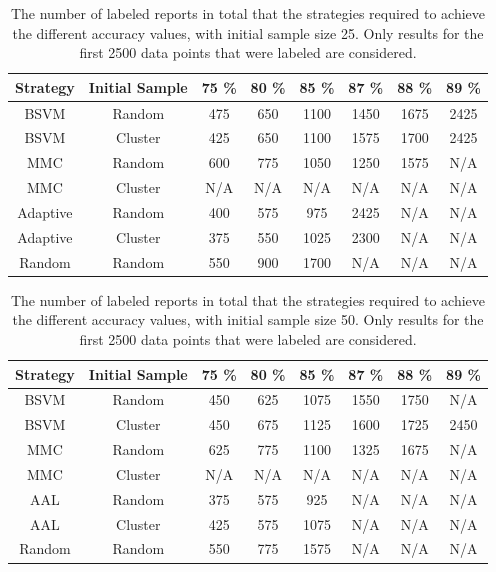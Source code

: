 \begin{table}
    \centering
    \begin{tabular}{|cccccccc|}
        \hline
        \textbf{Strategy} & \textbf{Initial Sample} & \textbf{75 \%} & \textbf{80 \%} & \textbf{85 \%} & \textbf{87 \%} & \textbf{88 \%} & \textbf{89 \%}\\
        \hline
        BSVM & Random & 475 & 650 & 1100 & 1450 & 1675 & 2425\\
        BSVM & Cluster & 425 & 650 & 1100 & 1575 & 1700 & 2425\\
        MMC & Random & 600 & 775 & 1050 & 1250 & 1575 & N/A\\
        MMC & Cluster & N/A & N/A & N/A & N/A & N/A & N/A\\
        Adaptive & Random & 400 & 575 & 975 & 2425 & N/A & N/A\\
        Adaptive & Cluster & 375 & 550 & 1025 & 2300 & N/A & N/A\\
        Random & Random & 550 & 900 & 1700 & N/A & N/A & N/A\\
        \hline
    \end{tabular}
    \caption{The number of labeled reports in total that the strategies required to achieve the different accuracy values, with initial sample size 25. Only results for the first 2500 data points that were labeled are considered.}
    \label{tab:active-learning-accuracy-25}
\end{table}

\begin{table}
    \centering
    \begin{tabular}{|cccccccc|}
        \hline
        \textbf{Strategy} & \textbf{Initial Sample} & \textbf{75 \%} & \textbf{80 \%} & \textbf{85 \%} & \textbf{87 \%} & \textbf{88 \%} & \textbf{89 \%}\\
        \hline
        BSVM & Random & 450 & 625 & 1075 & 1550 & 1750 & N/A\\
        BSVM & Cluster & 450 & 675 & 1125 & 1600 & 1725 & 2450\\
        MMC & Random & 625 & 775 & 1100 & 1325 & 1675 & N/A\\
        MMC & Cluster & N/A & N/A & N/A & N/A & N/A & N/A\\
        AAL & Random & 375 & 575 & 925 & N/A & N/A & N/A\\
        AAL & Cluster & 425 & 575 & 1075 & N/A & N/A & N/A\\
        Random & Random & 550 & 775 & 1575 & N/A & N/A & N/A\\
        \hline
    \end{tabular}
    \caption{The number of labeled reports in total that the strategies required to achieve the different accuracy values, with initial sample size 50. Only results for the first 2500 data points that were labeled are considered.}
    \label{tab:active-learning-accuracy-50}
\end{table}

